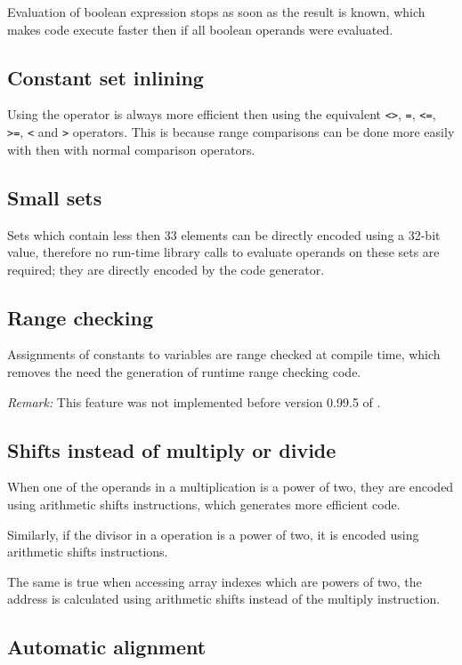\documentclass{report}
\begin{document}
Evaluation of boolean expression stops as soon as the result is
known, which makes code execute faster then if all boolean operands
were evaluated.

\subsection{ Constant set inlining }

Using the  operator is always more efficient then using the
equivalent \verb|<>|, \verb|=|, \verb|<=|, \verb|>=|, \verb|<| and \verb|>| 
operators. This is because range comparisons can be done more easily with 
 then with normal comparison operators.

\subsection{ Small sets }

Sets which contain less then 33 elements can be directly encoded
using a 32-bit value, therefore no run-time library calls to
evaluate operands on these sets are required; they are directly encoded
by the code generator.

\subsection{ Range checking }

Assignments of constants to variables are range checked at compile
time, which removes the need the generation of runtime range checking
code.

\emph{Remark:} This feature was not implemented before version
0.99.5 of \fpc.

\subsection{ Shifts instead of multiply or divide }

When one of the operands in a multiplication is a power of
two, they are encoded using arithmetic shifts instructions,
which generates more efficient code.

Similarly, if the divisor in a  operation is a power
of two, it is encoded using arithmetic shifts instructions.

The same is true when accessing array indexes which are
powers of two, the address is calculated using arithmetic
shifts instead of the multiply instruction.

\subsection{ Automatic alignment }
\end{document}
